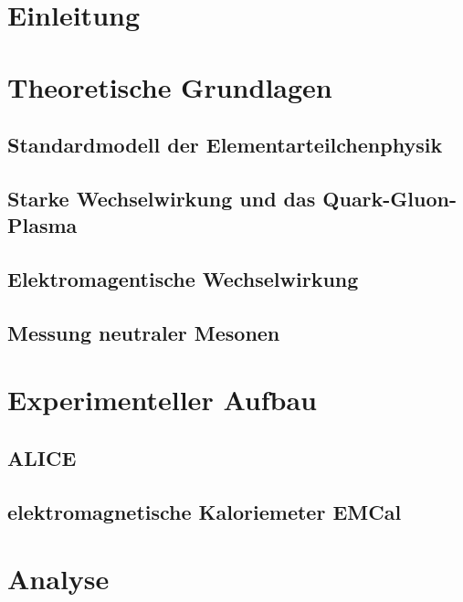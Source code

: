\documentclass[11pt]{article}
\author{Marvin Hemmer}
\begin{document}
\begin{titlepage}
\begin{center}

\end{center}
\end{titlepage}
\newpage
\tableofcontents
\newpage

\section*{Einleitung}

\section{Theoretische Grundlagen} \label{s1}
\subsection{Standardmodell der Elementarteilchenphysik} \label{s1s1}

\subsection{Starke Wechselwirkung und das Quark-Gluon-Plasma} \label{s1s2}

\subsection{Elektromagentische Wechselwirkung} \label{s1s3}
\subsection{Messung neutraler Mesonen} \label{s1s4}

\section{Experimenteller Aufbau} \label{s2}
\subsection{ALICE} \label{s2s1}
\subsection{elektromagnetische Kaloriemeter EMCal} \label{s2s2}

\section{Analyse} \label{s3}
\end{document}
